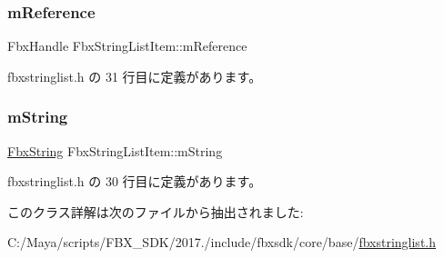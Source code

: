 \subsubsection{\texorpdfstring{m\+Reference}{mReference}}
{\footnotesize\ttfamily Fbx\+Handle Fbx\+String\+List\+Item\+::m\+Reference}



 fbxstringlist.\+h の 31 行目に定義があります。

\mbox{\label{class_fbx_string_list_item_ad084a731438913ea4a34dff1e4652fde}} 
\subsubsection{\texorpdfstring{m\+String}{mString}}
{\footnotesize\ttfamily \hyperlink{class_fbx_string}{Fbx\+String} Fbx\+String\+List\+Item\+::m\+String}



 fbxstringlist.\+h の 30 行目に定義があります。



このクラス詳解は次のファイルから抽出されました\+:\begin{DoxyCompactItemize}
\item 
C\+:/\+Maya/scripts/\+F\+B\+X\+\_\+\+S\+D\+K/2017./include/fbxsdk/core/base/\hyperlink{fbxstringlist_8h}{fbxstringlist.\+h}\end{DoxyCompactItemize}
